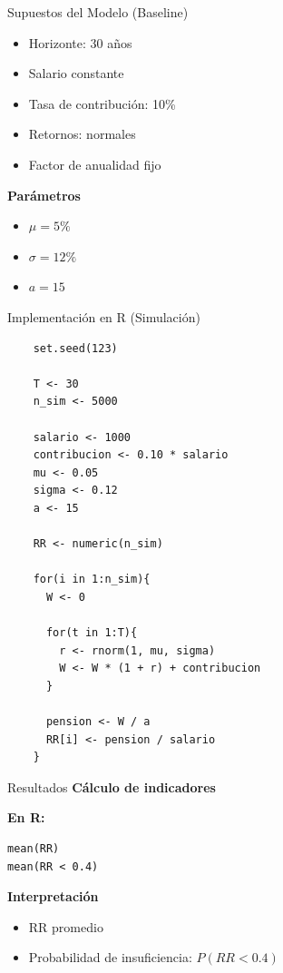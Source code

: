 \documentclass{beamer}
\begin{document}
\begin{frame}{Supuestos del Modelo (Baseline)}

\begin{itemize}
\item Horizonte: 30 años
\item Salario constante
\item Tasa de contribución: 10\%
\item Retornos: normales
\item Factor de anualidad fijo
\end{itemize}

\vspace{0.3cm}

\textbf{Parámetros}

\begin{itemize}
\item $\mu = 5\%$
\item $\sigma = 12\%$
\item $a = 15$
\end{itemize}

\end{frame}

\begin{frame}[fragile]{Implementación en R (Simulación)}
\scriptsize
    \begin{verbatim}
    set.seed(123)
    
    T <- 30
    n_sim <- 5000
    
    salario <- 1000
    contribucion <- 0.10 * salario
    mu <- 0.05
    sigma <- 0.12
    a <- 15
    
    RR <- numeric(n_sim)
    
    for(i in 1:n_sim){
      W <- 0
      
      for(t in 1:T){
        r <- rnorm(1, mu, sigma)
        W <- W * (1 + r) + contribucion
      }
      
      pension <- W / a
      RR[i] <- pension / salario
    }
    \end{verbatim}
\end{frame}

\begin{frame}[fragile]{Resultados}
\textbf{Cálculo de indicadores}

\vspace{0.3cm}

\textbf{En R:}
\scriptsize
\begin{verbatim}
mean(RR)
mean(RR < 0.4)
\end{verbatim}

\vspace{0.4cm}

\textbf{Interpretación}

\begin{itemize}
\item RR promedio
\item Probabilidad de insuficiencia: $P(RR < 0.4)$
\end{itemize}
\end{frame}
\end{document}
